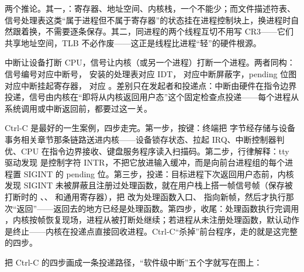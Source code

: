 两个推论。其一，：寄存器、地址空间、内核栈，一个不能少；而文件描述符表、信号处理表这类“属于进程但不属于寄存器”的状态挂在进程控制块上，换进程时自然跟着换，不需要逐条保存。其二，同进程的两个线程互切不用写 CR3——它们共享地址空间，TLB 不必作废——这正是线程比进程“轻”的硬件根源。

中断让设备打断 CPU，信号让内核（或另一个进程）打断一个进程。两者同构：信号编号对应中断号， 安装的处理表对应 IDT， 对应中断屏蔽字，pending 位图对应中断挂起寄存器， 对应 。差别只在发起者和投递点：中断由硬件在指令边界投递，信号由内核在“即将从内核返回用户态”这个固定检查点投递——每个进程从系统调用或中断返回前，都要过这一关。

Ctrl-C 是最好的一生案例，四步走完。第一步，按键：终端把  字节经存储与设备事务相关章节那条链路送进内核——设备锁存状态、拉起 IRQ、中断控制器判优、CPU 在指令边界接收、键盘服务程序读入扫描码。第二步，行律解释：tty 驱动发现  是控制字符 INTR，不把它放进输入缓冲，而是向前台进程组的每个进程置 SIGINT 的 pending 位。第三步，投递：目标进程下次返回用户态前，内核发现 SIGINT 未被屏蔽且注册过处理函数，就在用户栈上搭一帧信号帧（保存被打断时的 、、 和通用寄存器），把  改为处理函数入口、 指向新帧，然后才执行那次“返回”——返回去的地方已经是处理函数。第四步，收尾：处理函数执行完调用 ，内核按帧恢复现场，进程从被打断处继续；若进程从未注册处理函数，默认动作是终止——内核在投递点直接回收进程。Ctrl-C“杀掉”前台程序，走的就是这完整的四步。

把 Ctrl-C 的四步画成一条投递路径，“软件级中断”五个字就写在图上：

